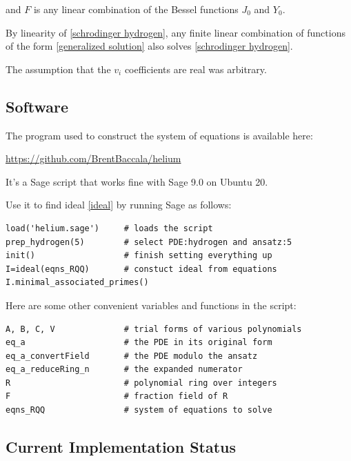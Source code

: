 \documentclass{article}
\begin{document}
and $F$ is any linear combination of the Bessel functions $J_0$ and $Y_0$.

By linearity of \eqref{schrodinger hydrogen}, any finite linear combination of functions of the form
\eqref{generalized solution} also solves \eqref{schrodinger hydrogen}.

The assumption that the $v_i$ coefficients are real was arbitrary.

\subsection*{Software}

The program used to construct the system of equations is available here:

\centerline{\url{https://github.com/BrentBaccala/helium}}

It's a Sage script that works fine with Sage 9.0 on Ubuntu 20.

Use it to find ideal \eqref{ideal} by
running Sage as follows:

\begin{verbatim}
load('helium.sage')     # loads the script
prep_hydrogen(5)        # select PDE:hydrogen and ansatz:5
init()                  # finish setting everything up
I=ideal(eqns_RQQ)       # constuct ideal from equations
I.minimal_associated_primes()
\end{verbatim}

Here are some other convenient variables and functions in the script:

\begin{verbatim}
A, B, C, V              # trial forms of various polynomials
eq_a                    # the PDE in its original form
eq_a_convertField       # the PDE modulo the ansatz
eq_a_reduceRing_n       # the expanded numerator
R                       # polynomial ring over integers
F                       # fraction field of R
eqns_RQQ                # system of equations to solve
\end{verbatim}

\subsection*{Current Implementation Status}
\end{document}
